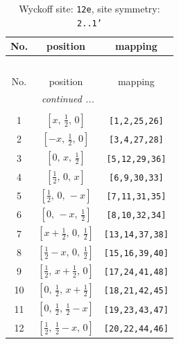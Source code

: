 \documentclass[fleqn,8pt]{jsarticle}
\begin{document}
\begin{longtable}{ccc}
\caption{Wyckoff site: {\tt 12e}, site symmetry: {\tt 2..1'}}
 \\
 \hline \hline
No. & position & mapping \\ \hline \endfirsthead

\multicolumn{2}{l}{\tablename\ \thetable{}} \\
 \hline \hline
No. & position & mapping \\ \hline \endhead

 \hline \hline
\multicolumn{2}{r}{\footnotesize\it continued ...} \\ \endfoot

 \hline \hline
\multicolumn{2}{r}{} \\ \endlastfoot

1 & $\left[ x,\, \frac{1}{2},\, 0 \right]$ & {\tt [1,2,25,26]} \\ \hline
2 & $\left[ - x,\, \frac{1}{2},\, 0 \right]$ & {\tt [3,4,27,28]} \\ \hline
3 & $\left[ 0,\, x,\, \frac{1}{2} \right]$ & {\tt [5,12,29,36]} \\ \hline
4 & $\left[ \frac{1}{2},\, 0,\, x \right]$ & {\tt [6,9,30,33]} \\ \hline
5 & $\left[ \frac{1}{2},\, 0,\, - x \right]$ & {\tt [7,11,31,35]} \\ \hline
6 & $\left[ 0,\, - x,\, \frac{1}{2} \right]$ & {\tt [8,10,32,34]} \\ \hline
7 & $\left[ x + \frac{1}{2},\, 0,\, \frac{1}{2} \right]$ & {\tt [13,14,37,38]} \\ \hline
8 & $\left[ \frac{1}{2} - x,\, 0,\, \frac{1}{2} \right]$ & {\tt [15,16,39,40]} \\ \hline
9 & $\left[ \frac{1}{2},\, x + \frac{1}{2},\, 0 \right]$ & {\tt [17,24,41,48]} \\ \hline
10 & $\left[ 0,\, \frac{1}{2},\, x + \frac{1}{2} \right]$ & {\tt [18,21,42,45]} \\ \hline
11 & $\left[ 0,\, \frac{1}{2},\, \frac{1}{2} - x \right]$ & {\tt [19,23,43,47]} \\ \hline
12 & $\left[ \frac{1}{2},\, \frac{1}{2} - x,\, 0 \right]$ & {\tt [20,22,44,46]} \\
\end{longtable}
\renewcommand{\arraystretch}{1.2}
\end{document}
